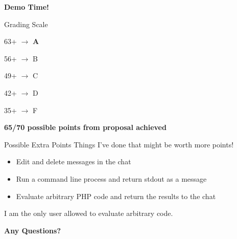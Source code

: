 \documentclass{beamer}
\begin{document}
\begin{frame}
    \begin{center}
        \Large\textbf{Demo Time!}
    \end{center}
\end{frame}


\begin{frame}{Grading Scale}
    
    63+ $\rightarrow$ \textbf{A}
    
    56+ $\rightarrow$ B
    
    49+ $\rightarrow$ C
    
    42+ $\rightarrow$ D
    
    35+ $\rightarrow$ F
    
    \textbf{65/70 possible points from proposal achieved}
    
\end{frame}



\begin{frame}{Possible Extra Points}
	Things I've done that might be worth more points!
	\begin{itemize}
        \item Edit and delete messages in the chat
		\item Run a command line process and return stdout as a message
        \item Evaluate arbitrary PHP code and return the results to the chat
	\end{itemize}
    \footnotesize I am the only user allowed to evaluate arbitrary code.
   
\end{frame}



\begin{frame}
	\begin{center}
		\Large\textbf{Any Questions?}
	\end{center}
\end{frame}
\end{document}
